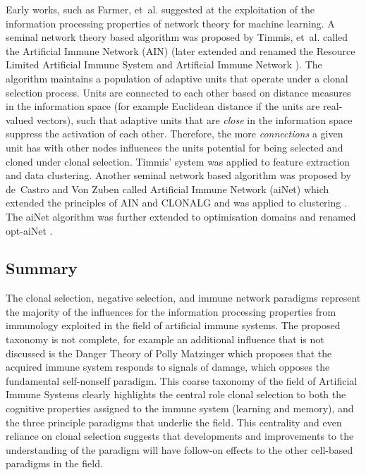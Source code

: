 Early works, such as Farmer, et~al. \cite{Farmer1986a} suggested at the exploitation of the information processing properties of network theory for machine learning. A seminal network theory based algorithm was proposed by Timmis, et~al. called the Artificial Immune Network (AIN) \cite{Timmis2000a}  (later extended and renamed the Resource Limited Artificial Immune System \cite{Timmis2001, Timmis2000} and Artificial Immune Network \cite{Knight2001a}). The algorithm maintains a population of adaptive units that operate under a clonal selection process. Units are connected to each other based on distance measures in the information space (for example Euclidean distance if the units are real-valued vectors), such that adaptive units that are \emph{close} in the information space suppress the activation of each other. Therefore, the more \emph{connections} a given unit has with other nodes influences the units potential for being selected and cloned under clonal selection. Timmis' system was applied to feature extraction and data clustering. Another seminal network based algorithm was proposed by de~Castro and Von Zuben called Artificial Immune Network (aiNet) which extended the principles of AIN and CLONALG and was applied to clustering  \cite{Castro2000c, Castro2001a}. The aiNet algorithm was further extended to optimisation domains and renamed opt-aiNet \cite{Castro2002c}.

%
%
\subsection{Summary}
\label{subsec:background:schools:summary}
The clonal selection, negative selection, and immune network paradigms represent the majority of the influences for the information processing properties from immunology exploited in the field of artificial immune systems. 
The proposed taxonomy is not complete, for example an additional influence that is not discussed is the Danger Theory of Polly Matzinger \cite{Matzinger1994, Matzinger2002} which proposes that the acquired immune system responds to signals of damage, which opposes the fundamental self-nonself paradigm. 
This coarse taxonomy of the field of Artificial Immune Systems clearly highlights the central role clonal selection to both the cognitive properties assigned to the immune system (learning and memory), and the three principle paradigms that underlie the field. This centrality and even reliance on clonal selection suggests that developments and improvements to the understanding of the paradigm will have follow-on effects to the other cell-based paradigms in the field. 


